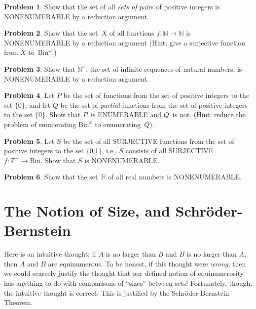 \documentclass[10pt,a4paper]{article}
\newcommand*{\olup}[1]{\MakeUppercase{#1}}
\theoremstyle{plain}
\theoremstyle{definition}
\newtheorem{prob}{Problem}[section]
\theoremstyle{remark}
\newenvironment{explain}{}{}
\newcommand*{\olfileid}[3]{}
\newcommand*{\olsection}[1]{\section*{#1}}
\providecommand{\Nat}{\ensuremath{\mathbb{N}}}
\providecommand{\Real}{\mathbb{R}}
\providecommand{\PosInt}{\mathbb{Z}^{+}}
\providecommand{\Bin}{\mathrm{Bin}}
\begin{document}
\begin{prob}
Show that the set of all \emph{sets of} pairs of positive integers is
\olup{nonenumerable} by a reduction argument.
\end{prob}

\begin{prob}\label{sfr:siz:red:prob:nat-nat}
  Show that the set~$X$ of all functions $f\colon \Nat \to \Nat$ is
  \olup{nonenumerable} by a reduction argument (Hint: give a surjective
  function from $X$ to~$\Bin^\omega$.)
\end{prob}

\begin{prob}
Show that $\Nat^\omega$, the set of infinite sequences of
natural numbers, is \olup{nonenumerable} by a reduction argument.
\end{prob}

\begin{prob}
Let $P$ be the set of functions from the set of positive
integers to the set $\{0\}$, and let $Q$ be the set of \emph{partial}
functions from the set of positive integers to the set $\{0\}$. Show
that $P$~is \olup{enumerable} and $Q$~is not. (Hint: reduce the problem
of enumerating $\Bin^\omega$ to enumerating~$Q$).
\end{prob}

\begin{prob}
Let $S$ be the set of all \olup{surjective} functions from the set of
positive integers to the set \{0,1\}, i.e., $S$ consists of all
\olup{surjective}~$f\colon \PosInt \to \Bin$.  Show that $S$ is
\olup{nonenumerable}.
\end{prob}

\begin{prob}
Show that the set~$\Real$ of all real numbers is \olup{nonenumerable}.
\end{prob}





\olfileid{sfr}{siz}{sb}

\olsection{The Notion of Size, and Schr\"oder-Bernstein}

\begin{explain}
Here is an intuitive thought: if $A$ is no larger than $B$ and $B$ is
no larger than $A$, then $A$ and $B$ are equinumerous. To be honest,
if this thought were \emph{wrong}, then we could scarcely justify the
thought that our defined notion of equinumerosity has anything to do
with comparisons of ``sizes'' between sets!{} Fortunately, though,
the intuitive thought is correct. This is justified by the
Schr\"oder-Bernstein Theorem.
\end{explain}
\end{document}
